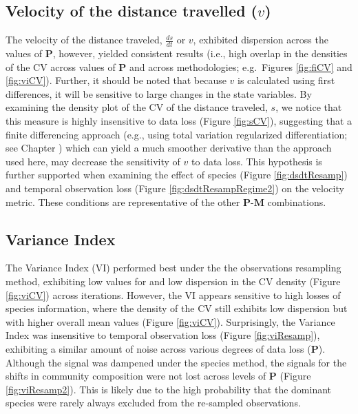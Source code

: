 \documentclass[print]{nuthesis}
\begin{document}
\hypertarget{velocity-of-the-distance-travelled-v}{%
\subsection{\texorpdfstring{Velocity of the distance travelled (\(v\))}{Velocity of the distance travelled (v)}}\label{velocity-of-the-distance-travelled-v}}

The velocity of the distance traveled, \(\frac{ds}{dt}\) or \(v\), exhibited dispersion across the values of \(\textbf{P}\), however, yielded consistent results (i.e., high overlap in the densities of the CV across values of \(\textbf{P}\) and across methodologies; e.g.~Figures \ref{fig:fiCV} and \ref{fig:viCV}). Further, it should be noted that because \(v\) is calculated using first differences, it will be sensitive to large changes in the state variables. By examining the density plot of the CV of the distance traveled, \(s\), we notice that this measure is highly insensitive to data loss (Figure \ref{fig:sCV}), suggesting that a finite differencing approach (e.g., using total variation regularized differentiation; see Chapter ) which can yield a much smoother derivative than the approach used here, may decrease the sensitivity of \(v\) to data loss. This hypothesis is further supported when examining the effect of species (Figure \ref{fig:dsdtResamp}) and temporal observation loss (Figure \ref{fig:dsdtResampRegime2}) on the velocity metric. These conditions are representative of the other \(\textbf{P}\)-\(\textbf{M}\) combinations.

\hypertarget{variance-index}{%
\subsection{Variance Index}\label{variance-index}}

The Variance Index (VI) performed best under the the observations resampling method, exhibiting low values for and low dispersion in the CV density (Figure \ref{fig:viCV}) across iterations. However, the VI appears sensitive to high losses of species information, where the density of the CV still exhibits low dispersion but with higher overall mean values (Figure \ref{fig:viCV}). Surprisingly, the Variance Index was insensitive to temporal observation loss (Figure \ref{fig:viResamp}), exhibiting a similar amount of noise across various degrees of data loss (\(\textbf{P}\)). Although the signal was dampened under the species method, the signals for the shifts in community composition were not lost across levels of \(\textbf{P}\) (Figure \ref{fig:viResamp2}). This is likely due to the high probability that the dominant species were rarely always excluded from the re-sampled observations.
\end{document}
